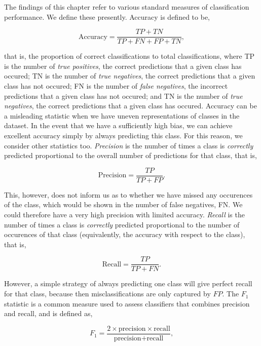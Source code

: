 The findings of this chapter refer to various standard measures of classification performance. We define these presently. Accuracy is defined to be,

\begin{equation}
\text{Accuracy} = \frac{TP + TN}{TP + FN + FP + TN},
\label{eq:accuracy}
\end{equation}

that is, the proportion of correct classifications to total classifications, where TP is the number of \emph{true positives}, the correct predictions that a given class has occured; TN is the number of \emph{true negatives}, the correct predictions that a given class has not occured; FN is the number of \emph{false negatives}, the incorrect predictions that a given class has not occured; and TN is the number of \emph{true negatives}, the correct predictions that a given class has occured. Accuracy can be a misleading statistic when we have uneven representations of classes in the dataset. In the event that we have a sufficiently high bias, we can achieve excellent accuracy simply by always predicting this class. For this reason, we consider other statistics too. \emph{Precision} is the number of times a class is \emph{correctly} predicted proportional to the overall number of predictions for that class, that is,

\begin{equation}
\text{Precision} = \frac{TP}{TP + FP}.
\label{eq:precision}
\end{equation}

This, however, does not inform us as to whether we have missed any occurences of the class, which would be shown in the number of false negatives, FN. We could therefore have a very high precision with limited accuracy. \emph{Recall} is the number of times a class is \emph{correctly} predicted proportional to the number of occurences of that class (equivalently, the accuracy with respect to the class), that is,

\begin{equation}
\text{Recall} = \frac{TP}{TP + FN}.
\label{eq:recall}
\end{equation}

However, a simple strategy of always predicting one class will give perfect recall for that class, because then misclassifications are only captured by $FP$. The $F_1$ statistic is a common measure used to assess classifiers that combines precision and recall, and is defined as,

\begin{equation}
F_1 = \frac{2 \times \text{precision} \times \text{recall}}{\text{precision} + \text{recall}},
\label{eq:f1}
\end{equation}

